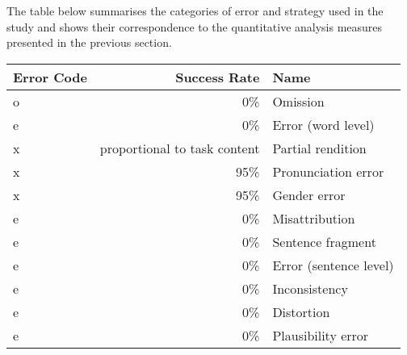 The table below summarises the categories of error and strategy used in the study and shows their correspondence to the quantitative analysis measures presented in the previous section.

\begin{table}
\begin{tabularx}{\textwidth}{lrQ}
\lsptoprule
{Error Code} & {Success Rate}                                                  & {Name}              \\
\midrule
o                                                             & 0\%                                                                    & Omission                   \\
e                                                             & 0\%                                                                    & Error (word level)         \\
x                                                             & proportional to task content & Partial rendition          \\
x                                                             & 95\%                                                                   & Pronunciation error        \\
x                                                             & 95\%                                                                   & Gender error               \\
e                                                             & 0\%                                                                    & Misattribution             \\
e                                                             & 0\%                                                                    & Sentence fragment          \\
e                                                             & 0\%                                                                    & Error (sentence level)     \\
e                                                             & 0\%                                                                    & Inconsistency              \\
e                                                             & 0\%                                                                    & Distortion                 \\
e                                                             & 0\%                                                                    & Plausibility error         \\

\end{tabularx}
\end{table}
